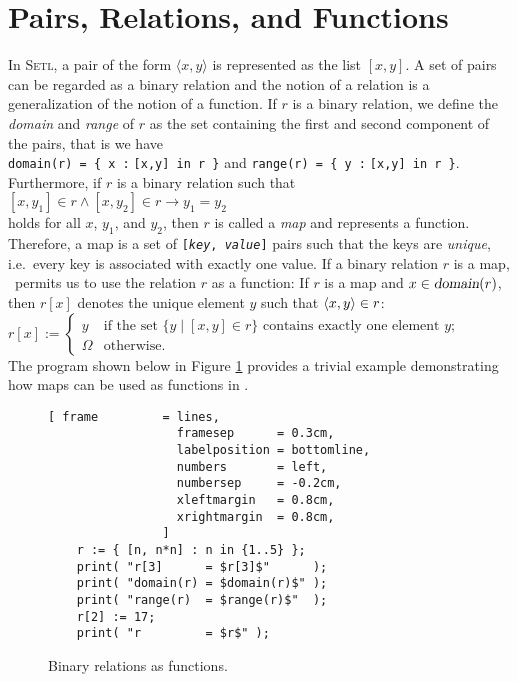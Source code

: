 \section{Pairs, Relations,  and Functions}
In \textsc{Setl}, a pair of the form $\langle x, y \rangle$ is represented as the list $[x,y]$.
A set of pairs can be regarded as a binary relation and the notion of a relation is a
generalization of the notion of a function.   If $r$ is a binary relation, we define the
\emph{domain} and \emph{range} of $r$ as the set containing the first and second component
of the pairs, that is we have
\\[0.2cm]
\hspace*{1.3cm}
\texttt{domain(r) = \{ x :$\;$[x,y] in r \}} \quad and \quad
\texttt{range(r)  = \{ y :$\;$[x,y] in r \}}.
\\[0.2cm]
Furthermore, if $r$ is a binary relation
such that 
\\[0.2cm]
\hspace*{1.3cm}
$[x,y_1] \in r \wedge [x,y_2] \in r \rightarrow y_1 = y_2$ 
\\[0.2cm]
holds for all $x$, $y_1$, and $y_2$, then $r$ is called a \emph{map} and represents a function.
Therefore, a map is a set of \texttt{[\textsl{key}, \textsl{value}]} pairs such that the
keys are \emph{unique}, i.e.~every key is associated with exactly one value.
If a binary relation $r$ is a map, \setlx\ permits us to use the relation $r$ as a function:  If $r$ is a map
and $x \in \textsl{domain}(r)$, then $r[x]$ denotes the unique element $y$ such that 
$\pair(x,y) \in r$:
\\[0.2cm]
\hspace*{1.3cm}
$r[x] := \left\{
\begin{array}{ll}
  y & \mbox{if the set $\{ y \mid [x,y] \in r\}$ contains exactly one element $y$;} \\[0.2cm]
  \Omega & \mbox{otherwise}.
\end{array} \right.
$
\\[0.2cm]
The program shown below in Figure
\ref{fig:map.stlx} provides a trivial example demonstrating how maps can be used
as functions in  \setlx.  
 

\begin{figure}[!ht]
  \centering
\begin{Verbatim}[ frame         = lines, 
                  framesep      = 0.3cm, 
                  labelposition = bottomline,
                  numbers       = left,
                  numbersep     = -0.2cm,
                  xleftmargin   = 0.8cm,
                  xrightmargin  = 0.8cm,
                ]
    r := { [n, n*n] : n in {1..5} };
    print( "r[3]      = $r[3]$"      );
    print( "domain(r) = $domain(r)$" );
    print( "range(r)  = $range(r)$"  );
    r[2] := 17;
    print( "r         = $r$" );
\end{Verbatim} 
\vspace*{-0.3cm}
\caption{Binary relations as functions.}  \label{fig:map.stlx}
\end{figure} %

